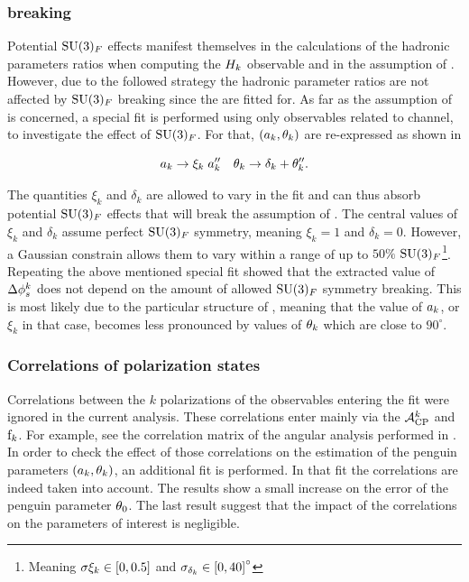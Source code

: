 \subsubsection{\grpsuthree breaking}
\label{su3_breaking}
Potential $\mathrm{SU}(3)_F$ effects manifest themselves in the calculations of the hadronic parameters ratios
when computing the $H_{k}$ observable and in the assumption of . However, due to the
followed strategy the hadronic parameter ratios are not affected by $\mathrm{SU}(3)_F$ breaking since the are fitted for.
As far as the assumption of  is concerned, a special fit is performed using only observables
related to \BdJpsiRho channel, to investigate the effect of $\mathrm{SU}(3)_F$. For that, $(a_k,\theta_k)$
are re-expressed as shown in 

\begin{equation}
  \centering
  \akPeng \to \xi_k \; \akPeng'' \quad \thkPeng \to \delta_k + \thkPeng''.
\label{su3_breaking}
\end{equation}

\noindent The quantities $\xi_k$ and $\delta_k$ are allowed to vary in the fit and can thus absorb
potential $\mathrm{SU}(3)_F$ effects that will break the assumption of .
The central values of $\xi_k$ and $\delta_k$ assume perfect $\mathrm{SU}(3)_F$ symmetry, meaning $\xi_k=1$ and $\delta_k=0$.
However, a Gaussian constrain allows them to vary within a range of up to $50\%$
$\mathrm{SU}(3)_F$\footnote{Meaning $\sigma{\xi_k}\in\left[ 0,0.5 \right]$ and $\sigma_{\delta_k}\in\left[ 0,40 \right]^\circ$ }.
Repeating the above mentioned special fit showed that the extracted value of $\Delta\phi_{s}^{k}$
does not depend on the amount of allowed $\mathrm{SU}(3)_F$ symmetry breaking.
This is most likely due to the particular structure of , meaning that
the value of $a_k$, or $\xi_k$ in that case, becomes less pronounced by values of
$\theta_k$ which are close to $90^\circ$.

\subsubsection{Correlations of polarization states}
Correlations between the $k$ polarizations of the observables entering the \chisq fit were ignored in the
current analysis. These correlations enter mainly via the $\mathcal{A}_{\rm CP}^{k}$ and $\text{f}_{k}$. For example, see the
correlation matrix  of the angular analysis performed in .
In order to check the effect of those correlations on the estimation of the penguin parameters $(a_k,\theta_k)$,
an additional \chisq fit is performed. In that fit the correlations are indeed taken into account.
The results show a small increase on the error of the penguin parameter $\theta_{0}$.
The last result suggest that the impact of the correlations on the parameters of interest is negligible.
